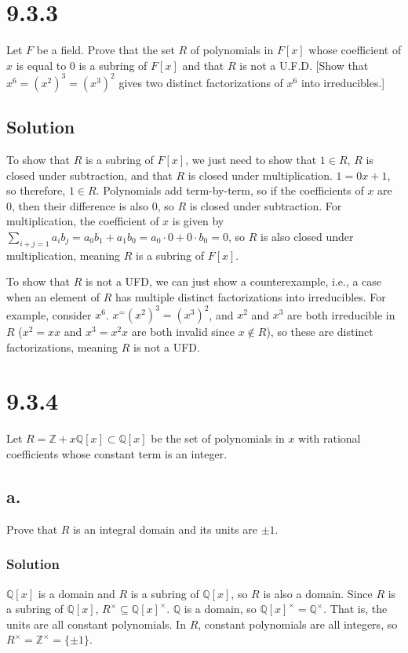 \documentclass[fleqn]{article}
\begin{document}
    \section{9.3.3}
    Let $F$ be a field.  Prove that the set $R$ of polynomials in $F[x]$ whose coefficient of $x$ is equal to 0 is a subring of $F[x]$ and that $R$ is not a U.F.D.  [Show that $x^6 = (x^2)^3 = (x^3)^2$ gives two distinct factorizations of $x^6$ into irreducibles.]
        
        \subsection{Solution}
        To show that $R$ is a subring of $F[x]$, we just need to show that $1 \in R$, $R$ is closed under subtraction, and that $R$ is closed under multiplication.  $1 = 0x + 1$, so therefore, $1 \in R$.  Polynomials add term-by-term, so if the coefficients of $x$ are 0, then their difference is also 0, so $R$ is closed under subtraction.  For multiplication, the coefficient of $x$ is given by $\sum\limits_{i + j = 1} a_i b_j = a_0 b_1 + a_1 b_0 = a_0 \cdot 0 + 0 \cdot b_0 = 0$, so $R$ is also closed under multiplication, meaning $R$ is a subring of $F[x]$.
        
        To show that $R$ is not a UFD, we can just show a counterexample, i.e., a case when an element of $R$ has multiple distinct factorizations into irreducibles.  For example, consider $x^6$.  $x^ = (x^2)^3 = (x^3)^2$, and $x^2$ and $x^3$ are both irreducible in $R$ ($x^2 = x x$ and $x^3 = x^2 x$ are both invalid since $x \notin R$), so these are distinct factorizations, meaning $R$ is not a UFD.
    
    \section{9.3.4}
    Let $R = \mathbb{Z} + x \mathbb{Q}[x] \subset \mathbb{Q}[x]$ be the set of polynomials in $x$ with rational coefficients whose constant term is an integer.
        
        \subsection{a.}
        Prove that $R$ is an integral domain and its units are $\pm 1$.
            
            \subsubsection{Solution}
            $\mathbb{Q}[x]$ is a domain and $R$ is a subring of $\mathbb{Q}[x]$, so $R$ is also a domain.  Since $R$ is a subring of $\mathbb{Q}[x]$, $R^\times \subseteq \mathbb{Q}[x]^\times$.  $\mathbb{Q}$ is a domain, so $\mathbb{Q}[x]^\times = \mathbb{Q}^\times$.  That is, the units are all constant polynomials.  In $R$, constant polynomials are all integers, so $R^\times = \mathbb{Z}^\times = \{\pm 1\}$.
        
\end{document}
